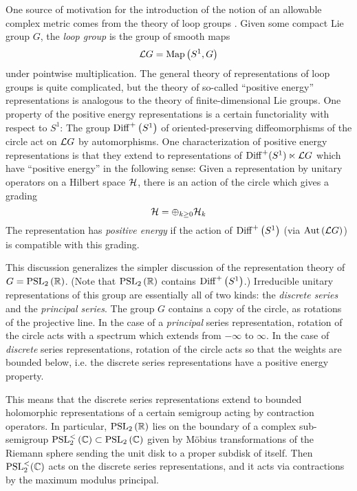 One source of motivation for the introduction of the notion of an allowable complex metric 
comes from the theory of loop groups \cite{PS}.
Given some compact Lie group $G$, the \emph{loop group} is the group of smooth maps 
\begin{equation*}
\mathcal{L} G = \operatorname{Map}\left(S^1 , G\right)
\end{equation*}
under pointwise multiplication. The general theory of representations of loop groups is
quite complicated, but the theory of so-called ``positive energy'' representations is
analogous to the theory of finite-dimensional Lie groups.
One property of the positive energy representations is a certain functoriality with
respect to $S^1$: 
The group $\operatorname{Diff}^+\left(S^1\right)$ of oriented-preserving diffeomorphisms of the circle
act on $\mathcal{L} G$ by automorphisms. One characterization of positive energy representations
is that they extend to representations of $\operatorname{Diff}^+(S^1) \ltimes \mathcal{L} G$
which have ``positive energy'' in the following sense:
Given a representation by unitary operators on a Hilbert space $\mathcal{H}$, there is an action
of the circle which gives a grading 
\begin{equation*}
\mathcal{H} = \oplus_{k \geq 0} \mathcal{H}_k
\end{equation*}
The representation has \emph{positive energy} if the action of
$\operatorname{Diff}^+\left(S^1\right)$ (via $\operatorname{Aut}\left(\mathcal{L} G\right)$) is compatible with this grading.

This discussion generalizes the simpler discussion of the representation theory of
$G = \mathrm{PSL}_2\left(\mathbb{R}\right)$. (Note that $\mathrm{PSL}_2\left(\mathbb{R}\right)$ contains
$\operatorname{Diff}^+\left(S^1\right)$.)
Irreducible unitary representations of this group are essentially all of two kinds: the 
\emph{discrete series} and the \emph{principal series}.
The group $G$ contains a copy of the circle, as rotations of the projective line. 
In the case of a \emph{principal} series representation, rotation of the circle acts with a
spectrum which extends from $-\infty$ to $\infty$.
In the case of \emph{discrete} series representations, rotation of the circle acts 
so that the weights are bounded below, i.e. the discrete series representations have
a positive energy property. 

This means that the discrete series representations extend to bounded holomorphic
representations of a certain semigroup acting by contraction operators.
In particular, $\mathrm{PSL}_2\left(\mathbb{R}\right)$ lies on the boundary of a complex sub-semigroup 
$\mathrm{PSL}_2^{<}\left(\mathbb{C}\right) \subset \mathrm{PSL}_2\left(\mathbb{C}\right)$ 
given by M\"obius transformations of the Riemann sphere sending the unit disk to a proper
subdisk of itself. Then $\mathrm{PSL}_2^<(\mathbb{C})$ acts on the discrete series
representations, and it acts via contractions by the maximum modulus principal. 

